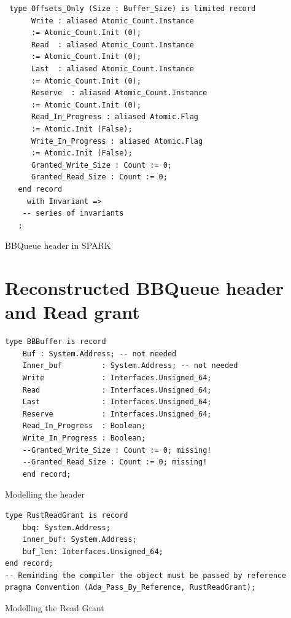 \documentclass[nomenclature, english, bibtex]{kththesis}
\begin{document}
{\begin{listing}[!ht]
\begin{verbatim}
 type Offsets_Only (Size : Buffer_Size) is limited record
      Write : aliased Atomic_Count.Instance 
      := Atomic_Count.Init (0);
      Read  : aliased Atomic_Count.Instance 
      := Atomic_Count.Init (0);
      Last  : aliased Atomic_Count.Instance 
      := Atomic_Count.Init (0);
      Reserve  : aliased Atomic_Count.Instance 
      := Atomic_Count.Init (0);
      Read_In_Progress : aliased Atomic.Flag 
      := Atomic.Init (False);
      Write_In_Progress : aliased Atomic.Flag 
      := Atomic.Init (False);
      Granted_Write_Size : Count := 0;
      Granted_Read_Size : Count := 0;
   end record
     with Invariant =>
    -- series of invariants
   ;
\end{verbatim}
\caption[BBQueue header in SPARK]{BBQueue header in SPARK}
\label{lst:SPARK_bbqueue_header}
\end{listing}
\FloatBarrier

\section{Reconstructed BBQueue header and Read grant}
\begin{listing}[ht!]
\begin{verbatim}
type BBBuffer is record
    Buf : System.Address; -- not needed
    Inner_buf         : System.Address; -- not needed
    Write             : Interfaces.Unsigned_64;
    Read              : Interfaces.Unsigned_64;
    Last              : Interfaces.Unsigned_64;
    Reserve           : Interfaces.Unsigned_64;
    Read_In_Progress  : Boolean;
    Write_In_Progress : Boolean;
    --Granted_Write_Size : Count := 0; missing!
    --Granted_Read_Size : Count := 0; missing!
    end record;
\end{verbatim}
\caption{Modelling the header}
\label{lst:bbqueueheaderinspark}
\end{listing}
\FloatBarrier


\begin{listing}[ht!]
\begin{verbatim}
type RustReadGrant is record
    bbq: System.Address;
    inner_buf: System.Address;
    buf_len: Interfaces.Unsigned_64;
end record;
-- Reminding the compiler the object must be passed by reference
pragma Convention (Ada_Pass_By_Reference, RustReadGrant);
\end{verbatim}
\caption{Modelling the Read Grant}
\label{lst:bbqueuereadgrantinspark}
\end{listing}
\FloatBarrier
\cleardoublepage

}
\end{document}
